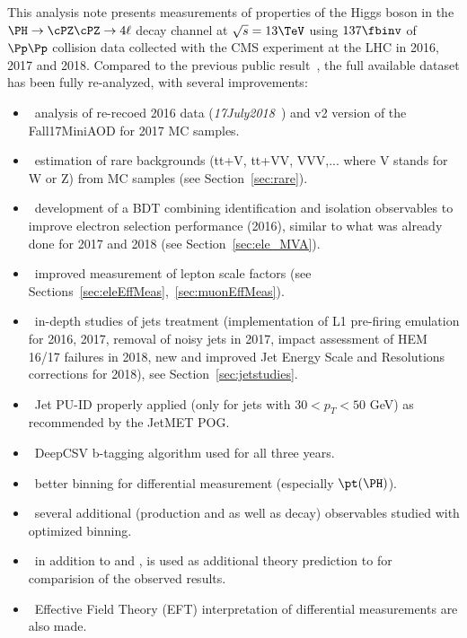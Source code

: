This analysis note presents measurements of properties of the Higgs boson in the $\HZZfl$ decay channel at $\sqrt{s}=13\TeV$
using $\usedLumiABC$ of $\Pp\Pp$ collision data collected with the CMS experiment at the LHC in 2016, 2017 and 2018.
Compared to the previous public result~\cite{CMS-PAS-HIG-09-001}, the full available dataset has been fully re-analyzed, with several improvements: 
\begin{itemize}
\item~analysis of re-recoed 2016 data (\textit{17July2018}~\cite{PPDtwiki})  and v2 version of the Fall17MiniAOD for 2017 MC samples.
\item~estimation of rare backgrounds (tt+V, tt+VV, VVV,... where V stands for W or Z) from MC samples (see Section~\ref{sec:rare}).
\item~development of a BDT combining identification and isolation observables to improve electron selection performance (2016), similar to what was already done for 2017 and 2018 (see Section~\ref{sec:ele_MVA}).
\item~improved measurement of lepton scale factors (see Sections~\ref{sec:eleEffMeas},~\ref{sec:muonEffMeas}). %
\item~in-depth studies of jets treatment (implementation of L1 pre-firing emulation for 2016, 2017, removal of noisy jets in 2017, impact assessment of HEM 16/17 failures in 2018, new and improved Jet Energy Scale and Resolutions corrections for 2018), see Section~\ref{sec:jetstudies}.
\item~Jet PU-ID properly applied (only for jets with $30<p_T<50$ GeV) as recommended by the JetMET POG.
\item~DeepCSV b-tagging algorithm used for all three years. 
\item~better binning for differential measurement (especially $\pt(\PH)$).
\item~several additional (production and as well as decay) observables studied with optimized binning.
\item~in addition to  and ,  is used as additional theory prediction to for comparision of the observed results.
\item~Effective Field Theory (EFT) interpretation of differential measurements are also made.
\end{itemize}

